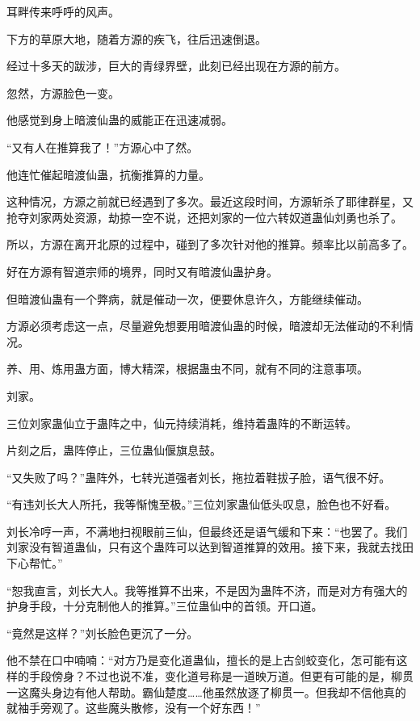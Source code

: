 
\begin{this_body}



耳畔传来呼呼的风声。

下方的草原大地，随着方源的疾飞，往后迅速倒退。

经过十多天的跋涉，巨大的青绿界壁，此刻已经出现在方源的前方。

忽然，方源脸色一变。

他感觉到身上暗渡仙蛊的威能正在迅速减弱。

“又有人在推算我了！”方源心中了然。

他连忙催起暗渡仙蛊，抗衡推算的力量。

这种情况，方源之前就已经遇到了多次。最近这段时间，方源斩杀了耶律群星，又抢夺刘家两处资源，劫掠一空不说，还把刘家的一位六转奴道蛊仙刘勇也杀了。

所以，方源在离开北原的过程中，碰到了多次针对他的推算。频率比以前高多了。

好在方源有智道宗师的境界，同时又有暗渡仙蛊护身。

但暗渡仙蛊有一个弊病，就是催动一次，便要休息许久，方能继续催动。

方源必须考虑这一点，尽量避免想要用暗渡仙蛊的时候，暗渡却无法催动的不利情况。

养、用、炼用蛊方面，博大精深，根据蛊虫不同，就有不同的注意事项。

刘家。

三位刘家蛊仙立于蛊阵之中，仙元持续消耗，维持着蛊阵的不断运转。

片刻之后，蛊阵停止，三位蛊仙偃旗息鼓。

“又失败了吗？”蛊阵外，七转光道强者刘长，拖拉着鞋拔子脸，语气很不好。

“有违刘长大人所托，我等惭愧至极。”三位刘家蛊仙低头叹息，脸色也不好看。

刘长冷哼一声，不满地扫视眼前三仙，但最终还是语气缓和下来：“也罢了。我们刘家没有智道蛊仙，只有这个蛊阵可以达到智道推算的效用。接下来，我就去找田下心帮忙。”

“恕我直言，刘长大人。我等推算不出来，不是因为蛊阵不济，而是对方有强大的护身手段，十分克制他人的推算。”三位蛊仙中的首领。开口道。

“竟然是这样？”刘长脸色更沉了一分。

他不禁在口中喃喃：“对方乃是变化道蛊仙，擅长的是上古剑蛟变化，怎可能有这样的手段傍身？不过也说不准，变化道号称是一道映万道。但更有可能的是，柳贯一这魔头身边有他人帮助。霸仙楚度……他虽然放逐了柳贯一。但我却不信他真的就袖手旁观了。这些魔头散修，没有一个好东西！”


\end{this_body}
